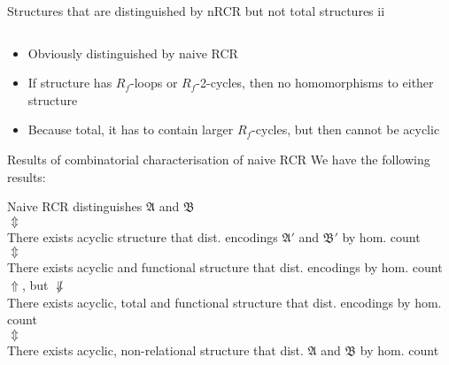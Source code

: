 \documentclass[aspectratio=169]{beamer}
\begin{document}
\begin{frame}{Structures that are distinguished by nRCR but not total structures ii}
\begin{columns}
			\begin{column}{0.25\textwidth}
				\centering
			\end{column}
		\end{columns}
		\begin{itemize}
			\item Obviously distinguished by naive RCR
			\item If structure has $R_f$-loops or $R_f$-2-cycles, then no homomorphisms to either structure
			\item Because total, it has to contain larger $R_f$-cycles, but then cannot be acyclic
		\end{itemize}
	\end{frame}
	
	\begin{frame}{Results of combinatorial characterisation of naive RCR}
		We have the following results:
		\begin{center}
			Naive RCR distinguishes $\mathfrak A$ and $\mathfrak B$\\
			$\Updownarrow$\\
			There exists acyclic structure that dist. encodings $\mathfrak A'$ and $\mathfrak B'$ by hom. count\\
			$\Updownarrow$\\
			There exists acyclic and functional structure that dist. encodings by hom. count\\
			$\Uparrow$, but $\not\Downarrow$\\
			There exists acyclic, total and functional structure that dist. encodings by hom. count\\
			$\Updownarrow$\\
			There exists acyclic, non-relational structure that dist. $\mathfrak A$ and $\mathfrak B$ by hom. count
		\end{center}
	\end{frame}
	
\end{document}
